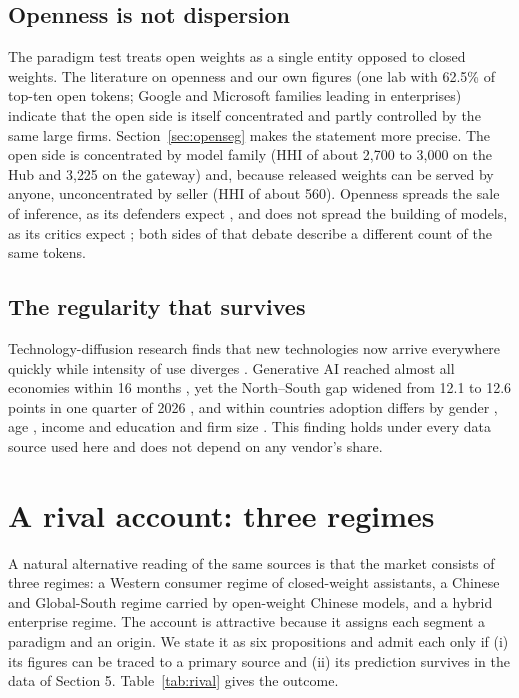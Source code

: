 \documentclass[11pt]{article}
\begin{document}
\subsection{Openness is not dispersion} The paradigm test treats open weights as a single entity opposed to closed weights. The literature on openness \cite{widder2024open,azoulay2025old,osborne2024ai} and our own figures (one lab with 62.5\% of top-ten open tokens; Google and Microsoft families leading in enterprises) indicate that the open side is itself concentrated and partly controlled by the same large firms. Section~\ref{sec:openseg} makes the statement more precise. The open side is concentrated by model family (HHI of about 2{,}700 to 3{,}000 on the Hub and 3{,}225 on the gateway) and, because released weights can be served by anyone, unconcentrated by seller (HHI of about 560). Openness spreads the sale of inference, as its defenders expect \cite{kapoor2024societal}, and does not spread the building of models, as its critics expect \cite{widder2024open}; both sides of that debate describe a different count of the same tokens.

\subsection{The regularity that survives} Technology-diffusion research finds that new technologies now arrive everywhere quickly while intensity of use diverges \cite{comin2010exploration,comin2018technology}. Generative AI reached almost all economies within 16 months \cite{liu2024who}, yet the North--South gap widened from 12.1 to 12.6 points in one quarter of 2026 \cite{microsoft2026q2}, and within countries adoption differs by gender \cite{humlum2025unequal,otis2024global}, age \cite{eurostat2025genai}, income and education \cite{cetic2025tic} and firm size \cite{mcelheran2024ai}. This finding holds under every data source used here and does not depend on any vendor's share.

\section{A rival account: three regimes}
\label{sec:rival}

A natural alternative reading of the same sources is that the market consists of three regimes: a Western consumer regime of closed-weight assistants, a Chinese and Global-South regime carried by open-weight Chinese models, and a hybrid enterprise regime. The account is attractive because it assigns each segment a paradigm and an origin. We state it as six propositions and admit each only if (i) its figures can be traced to a primary source and (ii) its prediction survives in the data of Section 5. Table~\ref{tab:rival} gives the outcome.
\end{document}
